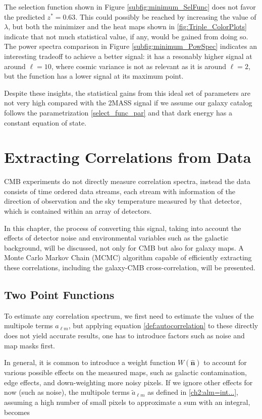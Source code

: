 \documentclass[openany,a4paper,12pt,oneside]{book}
\begin{document}
\begin{spacing}{1.5}
The selection function shown in Figure \ref{subfig:minimum_SelFunc} does not favor the predicted $z^*=0.63$. This could possibly be reached by increasing the value of $\lambda$, but both the minimizer and the heat maps shown in \ref{fig:Triple_ColorPlots} indicate that not much statistical value, if any, would be gained from doing so. The power spectra comparison in Figure \ref{subfig:minimum_PowSpec} indicates an interesting tradeoff to achieve a better signal: it has a resonably higher signal at around $\ell=10$, where cosmic variance is not as relevant as it is around $\ell=2$, but the function has a lower signal at its maximum point.

Despite these insights, the statistical gains from this ideal set of parameters are not very high compared with the 2MASS signal if we assume our galaxy catalog follows the parametrization \eqref{select_func_par} and that dark energy has a constant equation of state. 

\chapter{Extracting Correlations from Data} \label{chapter:extracting_correlations_from_data}

CMB experiments do not directly measure correlation spectra, instead the data consists of time ordered data streams, each stream with information of the direction of observation and the sky temperature measured by that detector, which is contained within an array of detectors. 

In this chapter, the process of converting this signal, taking into account the effects of detector noise and environmental variables such as the galactic background, will be discussed, not only for CMB but also for galaxy maps. A Monte Carlo Markov Chain (MCMC) algorithm capable of efficiently extracting these correlations, including the galaxy-CMB cross-correlation, will be presented.

\section{Two Point Functions}

To estimate any correlation spectrum, we first need to estimate the values of the multipole terms $a_{\ell m}$, but applying equation \eqref{def:autocorrelation} to these directly does not yield accurate results, one has to introduce factors such as noise and map masks first. 

In general, it is common to introduce a weight function $W(\hat{\mathbf{n}})$ to account for various possible effects on the measured maps, such as galactic contamination, edge effects, and down-weighting more noisy pixels\cite{Hivon_2002}. If we ignore other effects for now (such as noise), the multipole terms $\tilde{a}_{\ell m}$ as defined in \eqref{ch2:alm=int...}, assuming a high number of small pixels to approximate a sum with an integral, becomes


\end{spacing}
\end{document}
